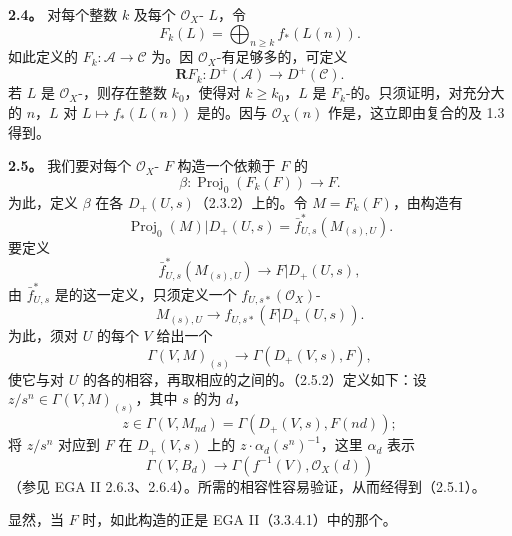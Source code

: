 \textbf{2.4。} 对每个整数 $k$ 及每个 $\mathcal O_X$- $L$，令
\[
F_k(L)=\bigoplus_{n\geq k}f_*(L(n)).\tag{2.4.1}
\]
如此定义的 $F_k:\mathscr A\to\mathscr C$ 为。因 $\mathcal O_X$-有足够多的，可定义
\[
\mathbf RF_k:D^+(\mathscr A)\longrightarrow D^+(\mathscr C).\tag{2.4.2}
\]
若 $L$ 是 $\mathcal O_X$-，则存在整数 $k_0$，使得对 $k\geq k_0$，$L$ 是 $F_k$-的。只须证明，对充分大的 $n$，$L$ 对 $L\mapsto f_*(L(n))$ 是的。因与 $\mathcal O_X(n)$ 作是，这立即由复合的及 1.3 得到。

\textbf{2.5。} 我们要对每个 $\mathcal O_X$- $F$ 构造一个依赖于 $F$ 的
\[
\beta:\operatorname{Proj}_0(F_k(F))\longrightarrow F.\tag{2.5.1}
\]
为此，定义 $\beta$ 在各 $D_+(U,s)$（2.3.2）上的。令 $M=F_k(F)$，由构造有
\[
\operatorname{Proj}_0(M)|D_+(U,s)=\bar f_{U,s}^*(M_{(s),U}).
\]
要定义
\[
\bar f_{U,s}^*(M_{(s),U})\longrightarrow F|D_+(U,s),
\]
由 $\bar f_{U,s}^*$ 是的这一定义，只须定义一个 $f_{U,s*}(\mathcal O_X)$-
\[
M_{(s),U}\longrightarrow f_{U,s*}(F|D_+(U,s)).
\]
为此，须对 $U$ 的每个 $V$ 给出一个
\[
\Gamma(V,M)_{(s)}\longrightarrow\Gamma(D_+(V,s),F),\tag{2.5.2}
\]
使它与对 $U$ 的各的相容，再取相应的之间的。（2.5.2）定义如下：设 $z/s^n\in\Gamma(V,M)_{(s)}$，其中 $s$ 的为 $d$，
\[
z\in\Gamma(V,M_{nd})=\Gamma(D_+(V,s),F(nd));
\]
将 $z/s^n$ 对应到 $F$ 在 $D_+(V,s)$ 上的 $z\cdot\alpha_d(s^n)^{-1}$，这里 $\alpha_d$ 表示
\[
\Gamma(V,B_d)\longrightarrow\Gamma(f^{-1}(V),\mathcal O_X(d))
\]
（参见 EGA II 2.6.3、2.6.4）。所需的相容性容易验证，从而经得到（2.5.1）。

显然，当 $F$ 时，如此构造的正是 EGA II（3.3.4.1）中的那个。

